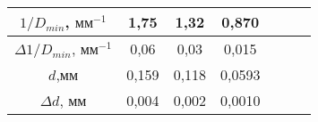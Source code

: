 \begin{tabular}{|c|c|c|c|c|c|c|}
\hline
$1/D_{min}$, $\text{мм}^{-1}$&1,75&1,32&0,870\\
\hline
$\Delta 1/D_{min}$, $\text{мм}^{-1}$&0,06&0,03&0,015\\
\hline
$d$,мм&0,159&0,118&0,0593\\
\hline
$\Delta d$, мм&0,004&0,002&0,0010\\
\hline
\end{tabular}
